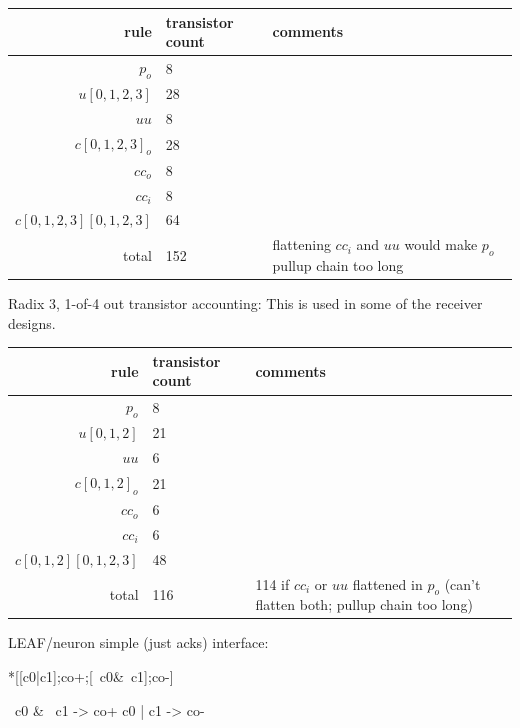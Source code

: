 \documentclass{article}
\begin{document}
\begin{center}
    \begin{tabular}{|r|l|l|}
    \hline
    rule & transistor count & comments \\ \hline
    $p_o$ & 8 & \\ \hline
    $u[0,1,2,3]$ & 28 & \\ \hline
    $uu$ & 8 & \\ \hline
    $c[0,1,2,3]_o$ & 28 & \\ \hline
    $cc_o$ & 8 & \\ \hline
    $cc_i$ & 8 & \\ \hline
    $c[0,1,2,3][0,1,2,3]$ & 64 & \\ \hline
    \hline total & 152 & flattening $cc_i$ and $uu$ would make $p_o$ pullup chain too long \\ \hline
    \end{tabular}
\end{center}

\noindent
Radix 3, 1-of-4 out transistor accounting: This is used in some of the receiver
designs.

\begin{center}
    \begin{tabular}{|r|l|l|}
    \hline
    rule & transistor count & comments \\ \hline
    $p_o$ & 8 & \\ \hline
    $u[0,1,2]$ & 21 & \\ \hline
    $uu$ & 6 & \\ \hline
    $c[0,1,2]_o$ & 21 & \\ \hline
    $cc_o$ & 6 & \\ \hline
    $cc_i$ & 6 & \\ \hline
    $c[0,1,2][0,1,2,3]$ & 48 & \\ \hline
    \hline total & 116 & 114 if $cc_i$ or $uu$ flattened in $p_o$ (can't flatten both; pullup chain too long) \\ \hline
    \end{tabular}
\end{center}

\noindent LEAF/neuron simple (just acks) interface:

\begin{hse}
*[[c0|c1];co+;[~c0&~c1];co-]
\end{hse}

\begin{prs2}
~c0 & ~c1 -> co+
c0 | c1 -> co-
\end{prs2}
\end{document}
